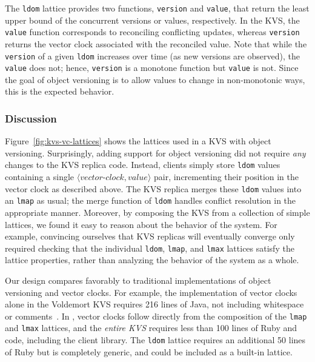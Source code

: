 The \texttt{ldom} lattice provides two functions, \texttt{version} and
\texttt{value}, that return the least upper bound of the concurrent versions or
values, respectively. In the KVS, the \texttt{value} function corresponds to
reconciling conflicting updates, whereas \texttt{version} returns the vector
clock associated with the reconciled value. Note that while the \texttt{version}
of a given \texttt{ldom} increases over time (as new versions are observed), the
\texttt{value} does not; hence, \texttt{version} is a monotone function but
\texttt{value} is not. Since the goal of object versioning is to allow values to
change in non-monotonic ways, this is the expected behavior.

\subsubsection{Discussion}
Figure~\ref{fig:kvs-vc-lattices} shows the lattices used in a KVS with object
versioning. Surprisingly, adding support for object versioning did not require
\emph{any} changes to the KVS replica code. Instead, clients simply store
\texttt{ldom} values containing a single
$\langle\textit{vector-clock},\textit{value}\rangle$ pair, incrementing their
position in the vector clock as described above. The KVS replica merges these
\texttt{ldom} values into an \texttt{lmap} as usual; the merge function of
\texttt{ldom} handles conflict resolution in the appropriate manner. Moreover,
by composing the KVS from a collection of simple lattices, we found it easy to
reason about the behavior of the system. For example, convincing ourselves that
KVS replicas will eventually converge only required checking that the individual
\texttt{ldom}, \texttt{lmap}, and \texttt{lmax} lattices satisfy the lattice
properties, rather than analyzing the behavior of the system as a whole.

Our design compares favorably to traditional implementations of object
versioning and vector clocks. For example, the implementation of vector clocks
alone in the Voldemort KVS requires 216 lines of Java, not including whitespace
or comments~\cite{voldemort-vector-clock}. In \lang, vector clocks follow
directly from the composition of the \texttt{lmap} and \texttt{lmax} lattices,
and the \emph{entire KVS} requires less than 100 lines of Ruby and \lang code,
including the client library. The \texttt{ldom} lattice requires an additional
50 lines of Ruby but is completely generic, and could be included as a built-in
lattice.

